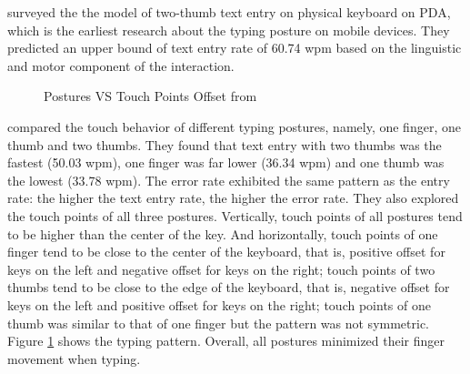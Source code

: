\documentclass[11pt]{article}
\begin{document}
\citet{twothumb2002} surveyed the the model of two-thumb text entry on physical keyboard on PDA, which is the earliest research about the typing posture on mobile devices. They predicted an upper bound of text entry rate of 60.74 wpm based on the linguistic and motor component of the interaction.

\begin{figure}[H]
\centering
{}\hfill
{}\hfill
\caption{Postures VS Touch Points Offset from \citep{10.1145/2371574.2371612}} \label{fig:posture}
\end{figure}

\citet{10.1145/2371574.2371612} compared the touch behavior of different typing postures, namely, one finger, one thumb and two thumbs. They found that text entry with two thumbs was the fastest (50.03 wpm), one finger was far lower (36.34 wpm) and one thumb was the lowest (33.78 wpm). The error rate exhibited the same pattern as the entry rate: the higher the text entry rate, the higher the error rate. They also explored the touch points of all three postures. Vertically, touch points of all postures tend to be higher than the center of the key. And horizontally, touch points of one finger tend to be close to the center of the keyboard, that is, positive offset for keys on the left and negative offset for keys on the right; touch points of two thumbs tend to be close to the edge of the keyboard, that is, negative offset for keys on the left and positive offset for keys on the right; touch points of one thumb was similar to that of one finger but the pattern was not symmetric. Figure \ref{fig:posture} shows the typing pattern. Overall, all postures minimized their finger movement when typing. 
\end{document}
